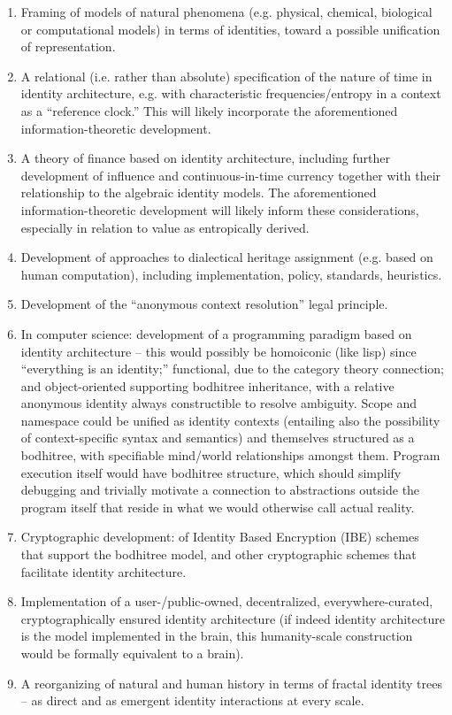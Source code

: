 \documentclass[pra,twocolumn,groupedaddress,10pt]{revtex4}
\theoremstyle{definition}
\begin{document}
\begin{enumerate}
	\item Framing of models of natural phenomena (e.g. physical, chemical, biological or computational models) in terms of identities, toward a possible unification of representation.
	\item A relational (i.e. rather than absolute) specification of the nature of time in identity architecture, e.g. with characteristic frequencies/entropy in a context as a ``reference clock.'' This will likely incorporate the aforementioned information-theoretic development.
	\item A theory of finance based on identity architecture, including further development of influence and continuous-in-time currency together with their relationship to the algebraic identity models. The aforementioned information-theoretic development will likely inform these considerations, especially in relation to value as entropically derived.
	\item Development of approaches to dialectical heritage assignment (e.g. based on human computation), including implementation, policy, standards, heuristics.
	\item Development of the ``anonymous context resolution'' legal principle.
	\item In computer science: development of a programming paradigm based on identity architecture -- this would possibly be homoiconic (like lisp) since ``everything is an identity;'' functional, due to the category theory connection; and object-oriented supporting bodhitree inheritance, with a relative anonymous identity always constructible to resolve ambiguity. Scope and namespace could be unified as identity contexts (entailing also the possibility of context-specific syntax and semantics) and themselves structured as a bodhitree, with specifiable mind/world relationships amongst them. Program execution itself would have bodhitree structure, which should simplify debugging and trivially motivate a connection to abstractions outside the program itself that reside in what we would otherwise call actual reality.
	\item Cryptographic development: of Identity Based Encryption (IBE) schemes that support the bodhitree model, and other cryptographic schemes that facilitate identity architecture.
	\item Implementation of a user-/public-owned, decentralized, everywhere-curated, cryptographically ensured identity architecture (if indeed identity architecture is the model implemented in the brain, this humanity-scale construction would be formally equivalent to a brain).
	\item A reorganizing of natural and human history in terms of fractal identity trees -- as direct and as emergent identity interactions at every scale.
\end{enumerate}
\end{document}
